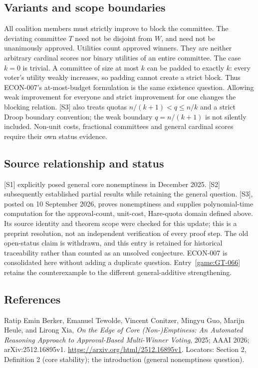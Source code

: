 \documentclass[11pt,a4paper]{article}
\begin{document}
\subsection*{Variants and scope boundaries}
All coalition members must strictly improve to block the committee.
The deviating committee \(T\) need not be disjoint from \(W\), and
need not be unanimously approved. Utilities count approved winners.
They are neither arbitrary cardinal scores nor binary utilities of
an entire committee. The case \(k=0\) is trivial.
A committee of size at most \(k\) can be padded to exactly \(k\): every
voter's utility weakly increases, so padding cannot create a strict block.
Thus ECON-007's at-most-budget formulation is the same existence question.
Allowing weak improvement for everyone and strict improvement for one changes
the blocking relation. [S3] also treats quotas \(n/(k+1)<q\leq n/k\) and a
strict Droop boundary convention; the weak boundary \(q=n/(k+1)\) is not
silently included. Non-unit costs, fractional committees and general cardinal
scores require their own status evidence.

\subsection*{Source relationship and status}
[S1] explicitly posed general core nonemptiness in December 2025.
[S2] subsequently established partial results while retaining the general
question. [S3], posted on 10 September 2026, proves nonemptiness and supplies
polynomial-time computation for the approval-count, unit-cost, Hare-quota
domain defined above. Its source identity and theorem scope were checked for
this update; this is a preprint resolution, not an independent verification of
every proof step. The old open-status claim is withdrawn, and this entry is
retained for historical traceability rather than counted as an unsolved
conjecture. ECON-007 is consolidated here without adding a duplicate question.
Entry~\ref{game:GT-066} retains the counterexample to the different
general-additive strengthening.

\subsection*{References}
\begingroup\footnotesize\raggedright
\noindent[S1] Ratip Emin Berker, Emanuel Tewolde, Vincent Conitzer,
Mingyu Guo, Marijn Heule, and Lirong Xia,
\emph{On the Edge of Core (Non-)Emptiness: An Automated Reasoning
Approach to Approval-Based Multi-Winner Voting},
2025; AAAI 2026; arXiv:2512.16895v1.
\url{https://arxiv.org/html/2512.16895v1}.
Locators: Section 2, Definition 2 (core stability);
the introduction (general nonemptiness question).
\end{document}
